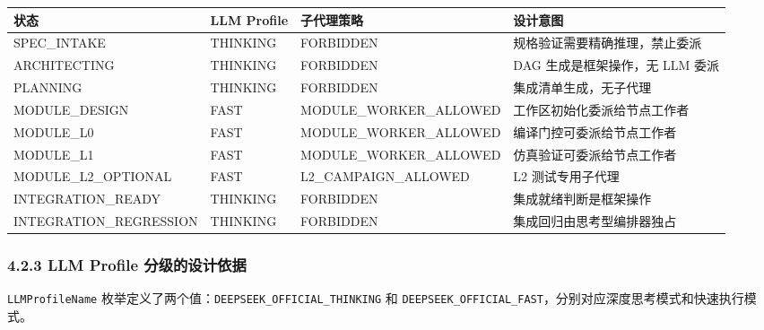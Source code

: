 {\def\LTcaptype{none} %
\begin{longtable}[]{@{}
  >{\raggedright\arraybackslash}p{}
  >{\raggedright\arraybackslash}p{}
  >{\raggedright\arraybackslash}p{}
  >{\raggedright\arraybackslash}p{}@{}}
\toprule\noalign{}
\begin{minipage}[b]{\linewidth}\raggedright
状态
\end{minipage} & \begin{minipage}[b]{\linewidth}\raggedright
LLM Profile
\end{minipage} & \begin{minipage}[b]{\linewidth}\raggedright
子代理策略
\end{minipage} & \begin{minipage}[b]{\linewidth}\raggedright
设计意图
\end{minipage} \\
\midrule\noalign{}
\endhead
\bottomrule\noalign{}
\endlastfoot
SPEC\_INTAKE & THINKING & FORBIDDEN & 规格验证需要精确推理，禁止委派 \\
ARCHITECTING & THINKING & FORBIDDEN & DAG 生成是框架操作，无 LLM 委派 \\
PLANNING & THINKING & FORBIDDEN & 集成清单生成，无子代理 \\
MODULE\_DESIGN & FAST & MODULE\_WORKER\_ALLOWED &
工作区初始化委派给节点工作者 \\
MODULE\_L0 & FAST & MODULE\_WORKER\_ALLOWED &
编译门控可委派给节点工作者 \\
MODULE\_L1 & FAST & MODULE\_WORKER\_ALLOWED &
仿真验证可委派给节点工作者 \\
MODULE\_L2\_OPTIONAL & FAST & L2\_CAMPAIGN\_ALLOWED & L2
测试专用子代理 \\
INTEGRATION\_READY & THINKING & FORBIDDEN & 集成就绪判断是框架操作 \\
INTEGRATION\_REGRESSION & THINKING & FORBIDDEN &
集成回归由思考型编排器独占 \\
\end{longtable}
}

\subsubsection{4.2.3 LLM Profile
分级的设计依据}\label{llm-profile-ux5206ux7ea7ux7684ux8bbeux8ba1ux4f9dux636e}

\texttt{LLMProfileName}
枚举定义了两个值：\texttt{DEEPSEEK\_OFFICIAL\_THINKING} 和
\texttt{DEEPSEEK\_OFFICIAL\_FAST}，分别对应深度思考模式和快速执行模式。

